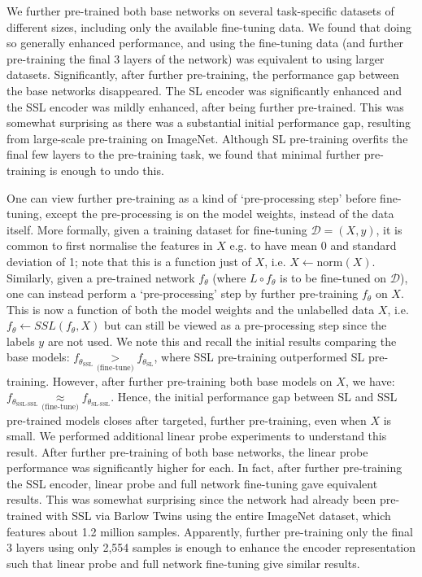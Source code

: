 \documentclass[a4paper,fleqn]{cas-dc}
\begin{document}
We further pre-trained both base networks on several task-specific datasets of different sizes, including only the available fine-tuning data. We found that doing so generally enhanced performance, and using the fine-tuning data (and further pre-training the final 3 layers of the network) was equivalent to using larger datasets. Significantly, after further pre-training, the performance gap between the base networks disappeared. The SL encoder was significantly enhanced and the SSL encoder was mildly enhanced, after being further pre-trained. This was somewhat surprising as there was a substantial initial performance gap, resulting from large-scale pre-training on ImageNet. Although SL pre-training overfits the final few layers to the pre-training task, we found that minimal further pre-training is enough to undo this. 

One can view further pre-training as a kind of `pre-processing step' before fine-tuning, except the pre-processing is on the model weights, instead of the data itself. More formally, given a training dataset for fine-tuning $\mathcal{D} = (X,y)$, it is common to first normalise the features in $X$ e.g. to have mean 0 and standard deviation of 1; note that this is a function just of $X$, i.e. $X \leftarrow \text{norm}(X)$.
Similarly, given a pre-trained network $f_\theta$ (where $L \circ f_\theta$ is to be fine-tuned on $\mathcal{D}$), one can instead perform a `pre-processing' step by further pre-training $f_\theta$ on $X$. This is now a function of both the model weights and the unlabelled data $X$, i.e. $f_\theta \leftarrow SSL(f_\theta,X)$ but can still be viewed as a pre-processing step since the labels $y$ are not used. We note this and recall the initial results comparing the base models: $f_{\theta_{\scriptscriptstyle\text{SSL}}}\underset{\scriptscriptstyle\text{(fine-tune)}}{>} f_{\theta_{\scriptscriptstyle\text{SL}}}$, where SSL pre-training outperformed SL pre-training. However, after further pre-training both base models on $X$, we have: $f_{\theta_{\scriptscriptstyle\text{SSL-SSL}}}\underset{\scriptscriptstyle\text{(fine-tune)}}{\approx} f_{\theta_{\scriptscriptstyle\text{SL-SSL}}}$. Hence, the initial performance gap between SL and SSL pre-trained models closes after targeted, further pre-training, even when $X$ is small. We performed additional linear probe experiments to understand this result. After further pre-training of both base networks, the linear probe performance was significantly higher for each. In fact, after further pre-training the SSL encoder, linear probe and full network fine-tuning gave equivalent results. This was somewhat surprising since the network had already been pre-trained with SSL via Barlow Twins using the entire ImageNet dataset, which features about 1.2 million samples. Apparently, further pre-training only the final 3 layers using only  2,554 samples is enough to enhance the encoder representation such that linear probe and full network fine-tuning give similar results.
\end{document}
